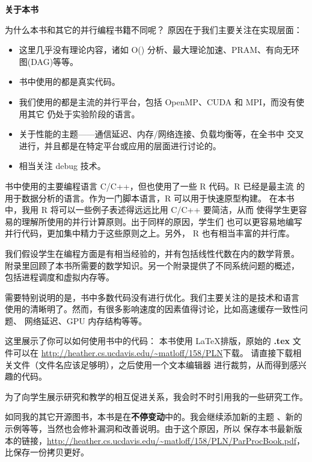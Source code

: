 ﻿\newpage

\begin{center}
{\bf \large 关于本书}
\end{center}

为什么本书和其它的并行编程书籍不同呢？
原因在于我们主要关注在实现层面：

\begin{itemize}

\item 这里几乎没有理论内容，诸如 O() 分析、最大理论加速、PRAM、有向无环图(DAG)等等。

\item 书中使用的都是真实代码。

\item 我们使用的都是主流的并行平台，包括 OpenMP、CUDA 和 MPI，而没有使用其它
仍处于实验阶段的语言。

\item 关于性能的主题——通信延迟、内存/网络连接、负载均衡等，在全书中
交叉进行，并且都是在特定平台或应用的层面进行讨论的。

\item 相当关注 debug 技术。

\end{itemize}

书中使用的主要编程语言 C/C++，但也使用了一些 R 代码。R 已经是最主流
的用于数据分析的语言。作为一门脚本语言，R 可以用于快速原型构建。
在本书中，我用 R 将可以一些例子表述得远远比用 C/C++ 要简洁，从而
使得学生更容易的理解所使用的并行计算原则。出于同样的原因，学生们
也可以更容易地编写并行代码，更加集中精力于这些原则之上。另外，
R 也有相当丰富的并行库。

我们假设学生在编程方面是有相当经验的，并有包括线性代数在内的数学背景。
附录里回顾了本书所需要的数学知识。另一个附录提供了不同系统问题的概述，
包括进程调度和虚拟内存等。

需要特别说明的是，书中多数代码没有进行优化。我们主要关注的是技术和语言
使用的清晰明了。然而，有很多影响速度的因素值得讨论，比如高速缓存一致性问题、
网络延迟、GPU 内存结构等等。

这里展示了你可以如何使用书中的代码：
本书使用 \LaTeX 排版，原始的 {\bf .tex} 文件可以在
\url{http://heather.cs.ucdavis.edu/~matloff/158/PLN}下载。
请直接下载相关文件（文件名应该足够明），之后使用一个文本编辑器
进行裁剪，从而得到感兴趣的代码。 

为了向学生展示研究和教学的相互促进关系，我会时不时引用我的一些研究工作。

如同我的其它开源图书，本书是在\textbf{不停变动}中的。我会继续添加新的主题
、新的示例等等，当然也会修补漏洞和改善说明。由于这个原因，所以
保存本书最新版本的链接，\url{http://heather.cs.ucdavis.edu/~matloff/158/PLN/ParProcBook.pdf}，
比保存一份拷贝更好。


